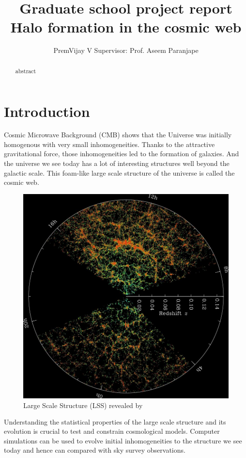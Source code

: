 \documentclass[12pt,twocolumn]{article}
\title{Graduate school project report\\
	Halo formation in the cosmic web}
\author{ PremVijay V \qquad Supervisor: Prof. Aseem Paranjape}
\begin{document}
\maketitle

\begin{abstract}
abstract
\end{abstract}

\section{Introduction}
Cosmic Microwave Background (CMB) shows that the Universe was initially homogenous with very small inhomogeneities. Thanks to the attractive gravitational force, those inhomogeneities led to the formation of galaxies. And the universe we see today has a lot of interesting structures well beyond the galactic scale. This foam-like large scale structure of the universe is called the cosmic web.

\begin{figure}[H]
	\centering
	\includegraphics[width=0.9\linewidth]{orangepie}
	\caption{ Large Scale Structure (LSS) revealed by \cite{cite_sdss}}
	\label{fig:orangepie}
\end{figure}
\noindent
Understanding the statistical properties of the large scale structure and its evolution is crucial to test and constrain cosmological models. Computer simulations can be used to evolve initial inhomogeneities to the structure we see today and hence can compared with sky survey observations.
\end{document}
